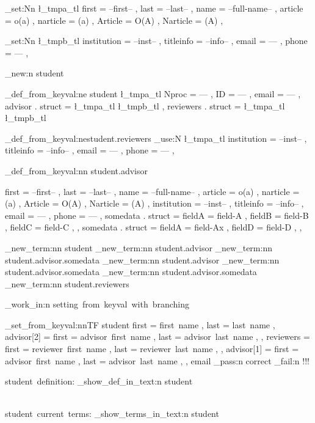 \documentclass{article}
\begin{document}
        \tl_set:Nn \l_tmpa_tl {
          first = --first-- ,
          last = --last-- ,
          name = --full-name-- ,
          article = o(a) ,
          narticle = (a) ,
          Article = O(A) ,
          Narticle = (A) ,
        }

        \tl_set:Nn \l_tmpb_tl {
          institution = --inst-- ,
          titleinfo = --info-- ,
          email = --- ,
          phone = --- ,
        }

        \starray_new:n {student}

        \starray_def_from_keyval:ne {student}
        {
          \l_tmpa_tl
          Nproc = --- ,
          ID = --- ,
          email = --- ,
          advisor . struct = {
            \l_tmpa_tl
            \l_tmpb_tl
          } ,
          reviewers . struct = {
            \l_tmpa_tl
            \l_tmpb_tl
          }
        }

        \starray_def_from_keyval:ne{student.reviewers}
        {
          \tl_use:N \l_tmpa_tl
          institution = --inst-- ,
          titleinfo = --info-- ,
          email = --- ,
          phone = --- ,
        }

        \starray_def_from_keyval:nn {student.advisor}
        {
          first = --first-- ,
          last = --last-- ,
          name = --full-name-- ,
          article = o(a) ,
          narticle = (a) ,
          Article = O(A) ,
          Narticle = (A) ,
          institution = --inst-- ,
          titleinfo = --info-- ,
          email = --- ,
          phone = --- ,
          somedata . struct = {
            fieldA = field-A ,
            fieldB = field-B ,
            fieldC = field-C ,
          } ,
          somedata . struct = {
            fieldA = field-Ax ,
            fieldD = field-D ,
          } ,
          
        }


        \starray_new_term:nn {student}{}
        \starray_new_term:nn {student.advisor}{}
        \starray_new_term:nn {student.advisor.somedata}{}
        \starray_new_term:nn {student.advisor}{}
        \starray_new_term:nn {student.advisor.somedata}{}
        \starray_new_term:nn {student.advisor.somedata}{}
        \starray_new_term:nn {student.reviewers}{}


\sttests_work_in:n {setting~from~keyval~with~branching}

      \starray_set_from_keyval:nnTF
        {student}
        {
          first = first~name ,
          last = last~name ,
          advisor[2] = {
            first = advisor~first~name ,
            last  = advisor~last~name ,
          } ,
          reviewers = {
            first = reviewer~first~name ,
            last  = reviewer~last~name ,
          } ,
          advisor[1] = {
            first = advisor~first~name ,
            last  = advisor~last~name ,
          } ,
          email
        }
        {\sttests_pass:n {correct}}
        {\sttests_fail:n {!!!}}

\par
student~definition:
\starray_show_def_in_text:n {student}

\\[2\baselineskip]
student~current~terms:
\starray_show_terms_in_text:n {student}


\ExplSyntaxOff
\end{document}
